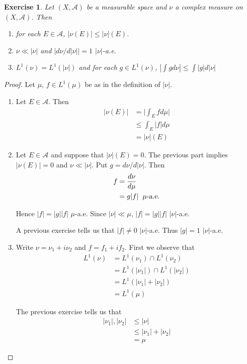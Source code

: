 \documentclass[12pt]{amsart}
\newtheorem{ex}[thm]{Exercise}
\newcommand{\MA}{\mathcal{A}}
\begin{document}
\begin{ex}
Let $(X, \MA)$ be a measurable space and $\nu$ a complex measure on $(X, \MA)$. Then 

\begin{enumerate}
\item for each $E \in \MA$, $|\nu(E)| \leq |\nu|(E)$. 
\item $\nu \ll |\nu|$ and $\big|d \nu /d |\nu|\big| = 1$ $|\nu|$-a.e.
\item $L^1(\nu) = L^1(|\nu|)$ and for each $g \in L^1(\nu)$, $|\int g d\nu| \leq \int |g|d |\nu|$
\end{enumerate}
\end{ex}

\begin{proof}
Let $\mu$, $f \in L^1(\mu)$ be as in the definition of $|\nu|$.
\begin{enumerate}
\item Let $E \in \MA$. Then 
\begin{align*}
|\nu(E)| 
& = \bigg|\int_E f d\mu\bigg|\\
& \leq \int_E |f| d\mu\\
&= |\nu|(E)
\end{align*}

\item Let $E \in \MA$ and suppose that $|\nu|(E)=0$. The previous part implies $|\nu(E)|=0$ and $\nu \ll |\nu|$. Put $g = d \nu / d|\nu|$. Then 
\begin{align*}
f 
&= \frac{d\nu}{d\mu}\\
&= g|f| \hspace{2mm }\mu\text{-a.e.}
\end{align*}

Hence $|f| = |g||f|$ $\mu$-a.e. Since $|\nu| \ll \mu$, $|f| = |g||f|$ $|\nu|$-a.e.

A previous exercise tells us that $|f| \neq 0$ $|\nu|$-a.e. Thus $|g|=1$ $|\nu|$-a.e.\\

\item Write $\nu = \nu_1 + i\nu_2$ and $f = f_1 + if_2$. First we observe that
\begin{align*}
L^1(\nu)
&= L^1(\nu_1) \cap L^1(\nu_2) \\
&= L^1(|\nu_1|) \cap L^1(|\nu_2|)\\
&= L^1(|\nu_1| + |\nu_2|)\\
&= L^1(\mu)
\end{align*}

The previous exercise tells us that 
\begin{align*}
|\nu_1|, |\nu_2| 
&\leq |\nu| \\
&\leq |\nu_1|+ |\nu_2| \\
&= \mu
\end{align*}


\end{enumerate}
\end{proof}
\end{document}
